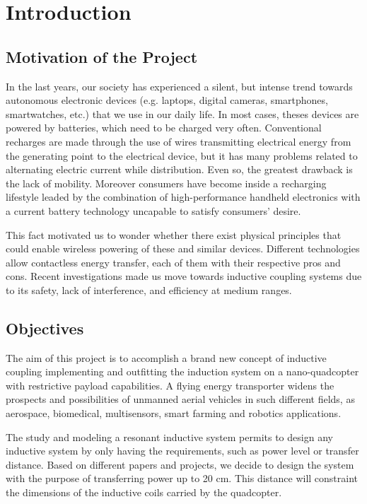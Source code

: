 \cleardoublepage
{}
\chapter{Introduction}

\section{Motivation of the Project}

In the last years, our society has experienced a silent, but intense trend towards autonomous electronic devices (e.g. laptops, digital cameras, smartphones, smartwatches, etc.) that we use in our daily life. In most cases, theses devices are powered by batteries, which need to be charged very often. Conventional recharges are made through the use of wires transmitting electrical energy from the generating point to the electrical device, but it has many problems related to alternating electric current while distribution. Even so, the greatest drawback is the lack of mobility. Moreover consumers have become inside a recharging lifestyle leaded by the combination of high-performance handheld electronics with a current battery technology uncapable to satisfy consumers' desire.

This fact motivated us to wonder whether there exist physical principles that could enable wireless powering of these and similar devices. Different technologies allow contactless energy transfer, each of them with their respective pros and cons. Recent investigations made us move towards inductive coupling systems due to its safety, lack of interference, and efficiency at medium ranges. 

\section{Objectives}
The aim of this project is to accomplish a brand new concept of inductive coupling implementing and outfitting the induction system on a nano-quadcopter with restrictive payload capabilities. A flying energy transporter widens the prospects and possibilities of unmanned aerial vehicles in such different fields, as aerospace, biomedical, multisensors, smart farming and robotics applications.

The study and modeling a resonant inductive system permits to design any inductive system by only having the requirements, such as power level or transfer distance. Based on different papers and projects, we decide to design the system with the purpose of transferring power up to 20 cm. This distance will constraint the dimensions of the inductive coils carried by the quadcopter.


